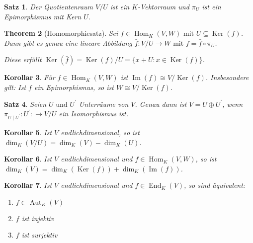 \documentclass[ngerman,a4paper]{report}
\theoremstyle{changebreak}
\newtheorem{theorem}{Theorem}[section]
\newtheorem{corollar}[theorem]{Korollar}
\newtheorem{satz}[theorem]{Satz}
\DeclareMathOperator{\Ker}{Ker}
\DeclareMathOperator{\im}{Im}
\DeclareMathOperator{\End}{End}
\DeclareMathOperator{\aut}{Aut}
\DeclareMathOperator{\Hom}{Hom}
\begin{document}
\begin{satz}
    Der Quotientenraum $V\slash U$ ist ein $K$-Vektorraum und $\pi_U$ ist ein Epimorphismus mit Kern $U$.
\end{satz}

\begin{theorem}[Homomorphiesatz]
    Sei $f \in \Hom_K(V,W) \text{ mit }U\subseteq \Ker(f)$. Dann gibt es genau eine lineare Abbildung $\bar{f}:V\slash U \to W \text{ mit } f = \bar{f} \circ \pi_U$. 
    \begin{center}
    \end{center}
    Diese erfüllt $\Ker(\bar{f})=\Ker(f)\slash U = \{x+U\colon x\in \Ker(f)\}$.
\end{theorem}

\begin{corollar}
    Für $f \in \Hom_K(V,W)$ ist $\im(f) \cong V\slash \Ker(f)$. Insbesondere gilt: Ist $f$ ein Epimorphismus, so ist $W\cong V\slash \Ker(f)$.
\end{corollar}

\begin{satz}
    Seien $U \text{ und } U^{\prime}$ Unterräume von $V$. Genau dann ist $V = U\oplus U^{\prime}$, wenn $\pi_{U\mid U^{\prime}}:U^{\prime}:\to V\slash U$ ein Isomorphismus ist.
\end{satz}

\begin{corollar}
    Ist $V$ endlichdimensional, so ist $\dim_K(V\slash U) = \dim_K(V) - \dim_K(U)$.
\end{corollar}

\begin{corollar}
    Ist $V$ endlichdimensional und $f \in \Hom_K(V,W)$, so ist $\dim_K(V)=\dim_K(\Ker(f))+\dim_K(\im(f))$.
\end{corollar}

\begin{corollar}
    Ist $V$ endlichdimensional und $f \in \End_K(V)$, so sind äquivalent:
    \begin{enumerate}[(1)]
    \item $f\in \aut_K(V)$
    \item $f$ ist injektiv
    \item $f$ ist surjektiv
    \end{enumerate}
\end{corollar}
\end{document}
